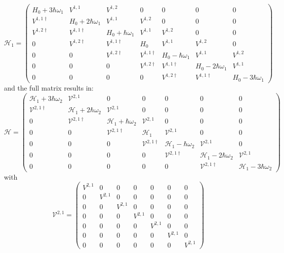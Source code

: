 \documentclass[pra,twocolumn,showkeys,preprintnumbers, amsmath,amssymb, aps,A4paper]{revtex4-1}
\begin{document}
\begin{widetext}
\[
\mathcal{H}_1 = \begin{pmatrix}
 H_0 + 3 \hbar \omega_1 & V^{1,1} & V^{1,2} & 0 & 0 & 0 &0 \\
  V^{1,1\dagger} & H_0 + 2 \hbar  \omega_1 & V^{1,1} & V^{1,2} & 0 & 0 & 0 \\
 V^{1,2 \dagger} &  V^{1,1\dagger} & H_0 + \hbar \omega_1 & V^{1,1} & V^{1,2} & 0 & 0 \\
 0 &V^{1,2 \dagger} &  V^{1,1 \dagger} & H_0  & V^{1,1}  & V^{1,2} & 0  \\
 0 & 0 &V^{1,2 \dagger} &  V^{1,1 \dagger} & H_0 - \hbar \omega_1 & V^{1,1} & V^{1,2}   \\
 0 & 0 & 0 &V^{1,2 \dagger} &  V^{1,1 \dagger} & H_0 - 2 \hbar \omega_1 & V^{1,1} \\
 0 & 0 & 0 & 0 &V^{1,2 \dagger} &  V^{1,1 \dagger} & H_0 - 3 \hbar \omega_1 
\end{pmatrix}
\]
\noindent
and the full matrix results in:
\[
\mathcal{H} = \begin{pmatrix}
 \mathcal{H}_1 + 3 \hbar \omega_2 & \mathcal{V}^{2,1} & 0 & 0 & 0 & 0 &0 \\
  \mathcal{V}^{2,1\dagger} & \mathcal{H}_1 + 2 \hbar  \omega_2 & \mathcal{V}^{2,1} & 0 & 0 & 0 & 0 \\
 0 &  \mathcal{V}^{2,1\dagger} & \mathcal{H}_1 + \hbar \omega_2 & \mathcal{V}^{2,1} & 0 & 0 & 0 \\
 0 & 0 &  \mathcal{V}^{2,1 \dagger} & \mathcal{H}_1  & \mathcal{V}^{2,1}  &0 & 0  \\
 0 & 0 & 0 &  \mathcal{V}^{2,1 \dagger} & \mathcal{H}_1 - \hbar \omega_2 & \mathcal{V}^{2,1} & 0   \\
 0 & 0 & 0 &0 &  \mathcal{V}^{2,1 \dagger} & \mathcal{H}_1 - 2 \hbar \omega_2 & \mathcal{V}^{2,1} \\
 0 & 0 & 0 & 0 & 0 &  \mathcal{V}^{2,1 \dagger} & \mathcal{H}_1 - 3 \hbar \omega_2
\end{pmatrix}
\]
with
\[
\mathcal{V}^{2,1} = \begin{pmatrix}
  V^{2,1} & 0 & 0 & 0 & 0 & 0 &0 \\
  0&V^{2,1} & 0 & 0 & 0 & 0 & 0  \\
  0&0&V^{2,1} & 0 & 0 & 0 & 0  \\
  0&0&0&V^{2,1} & 0 & 0 & 0 \\
  0&0&0&0&V^{2,1} & 0 & 0  \\
  0&0&0&0&0&V^{2,1} & 0 \\
  0&0&0&0&0&0&V^{2,1}  
\end{pmatrix}
\]
\end{widetext}
\end{document}
